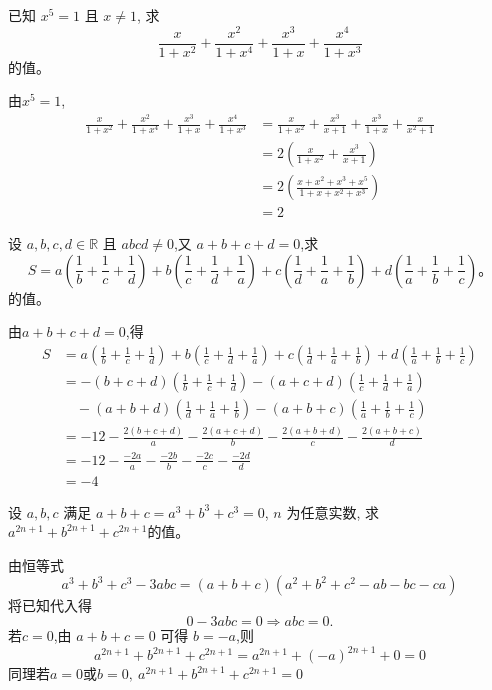 \begin{questions}
    \question 已知 $x^5=1$ 且 $x \neq 1$, 求
    \[
    \frac{x}{1+x^2} + \frac{x^2}{1+x^4} + \frac{x^3}{1+x} + \frac{x^4}{1+x^3} 
    \]
    的值。
    \begin{solution}
        由$x^5=1$,
        \begin{align*}
        \frac{x}{1+x^2} + \frac{x^2}{1+x^4} + \frac{x^3}{1+x} + \frac{x^4}{1+x^3} 
        &= \frac{x}{1+x^2} + \frac{x^3}{x+1} + \frac{x^3}{1+x} + \frac{x}{x^2+1} \\
        &= 2 \left(\frac{x}{1+x^2} + \frac{x^3}{x+1}\right) \\
        &= 2 \left(\frac{x+x^2+x^3+x^5}{1+x+x^2+x^3}\right) \\
        &= 2
        \end{align*}
    \end{solution}

    \question 设 $a,b,c,d \in \mathbb{R}$ 且 $abcd \neq 0$,又 $a+b+c+d=0$,求
    \[
    S=a\left(\frac{1}{b}+\frac{1}{c}+\frac{1}{d}\right)+b\left(\frac{1}{c}+\frac{1}{d}+\frac{1}{a}\right)+c\left(\frac{1}{d}+\frac{1}{a}+\frac{1}{b}\right)+d\left(\frac{1}{a}+\frac{1}{b}+\frac{1}{c}\right)。
    \]
    的值。
    \begin{solution}
        由$a+b+c+d=0$,得
        \begin{align*}
        S &= a\left(\frac{1}{b}+\frac{1}{c}+\frac{1}{d}\right) + b\left(\frac{1}{c}+\frac{1}{d}+\frac{1}{a}\right) + c\left(\frac{1}{d}+\frac{1}{a}+\frac{1}{b}\right) + d\left(\frac{1}{a}+\frac{1}{b}+\frac{1}{c}\right) \\
        &= -(b+c+d)\left(\frac{1}{b}+\frac{1}{c}+\frac{1}{d}\right) - (a+c+d)\left(\frac{1}{c}+\frac{1}{d}+\frac{1}{a}\right) \\
        &\quad - (a+b+d)\left(\frac{1}{d}+\frac{1}{a}+\frac{1}{b}\right) - (a+b+c)\left(\frac{1}{a}+\frac{1}{b}+\frac{1}{c}\right) \\
        &= -12-\frac{2(b+c+d)}{a}-\frac{2(a+c+d)}{b} -\frac{2(a+b+d)}{c} -\frac{2(a+b+c)}{d}\\
        &= -12-\frac{-2a}{a} -\frac{-2b}{b} -\frac{-2c}{c} -\frac{-2d}{d}\\
        &= -4
        \end{align*}
    \end{solution}

    \question 设 $a,b,c$ 满足 $a+b+c=a^{3}+b^{3}+c^{3}=0$, $n$ 为任意实数, 求 $a^{2n+1}+b^{2n+1}+c^{2n+1}$的值。
    \begin{solution}
        由恒等式
        \[
        a^3 + b^3 + c^3 - 3abc = (a + b + c)(a^2 + b^2 + c^2 - ab - bc - ca)
        \]
        将已知代入得
        \[
        0 - 3abc = 0 \Rightarrow abc = 0.
        \]
        若$c = 0$,由 $a + b + c = 0$ 可得 $b = -a$,则
        \[
        a^{2n+1} + b^{2n+1} + c^{2n+1} = a^{2n+1} + (-a)^{2n+1} + 0  = 0
        \]
        同理若$a = 0$或$b = 0,\ a^{2n+1} + b^{2n+1} + c^{2n+1}=0$
    \end{solution}


\end{questions}
